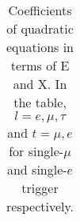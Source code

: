 \begin{table}[ht]
\begin{tabular}{c|l}
	\end{tabular}
    
\caption{ Coefficients of quadratic equations in terms of E and X. In the table, $l=e,\mu,\tau$ and $t=\mu,e$ for single-$\mu$ and single-$e$ trigger respectively.  }
\label{quadcoeff}
    
\end{table}